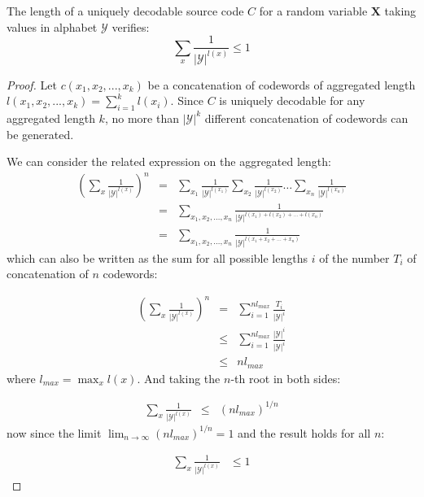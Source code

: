 \begin{theorem} The length of a uniquely decodable source code $C$ for a random variable $\mathbf{X}$ taking values in alphabet $\mathcal{Y}$ verifies:
\begin{equation*}
\sum_{x}\frac{1}{|\mathcal{Y}|^{l(x)}} \leq 1
\end{equation*}
\label{th:mcmillan}
\end{theorem}
\begin{proof}
Let $c(x_1, x_2, ..., x_k)$ be a concatenation of codewords of aggregated length $l(x_1, x_2, ..., x_k)=\sum_{i=1}^k l(x_i)$. Since $C$ is uniquely decodable for any aggregated length $k$, no more than $|\mathcal{Y}|^k$ different concatenation of codewords can be generated. 

We can consider the related expression on the aggregated length:
\begin{eqnarray}
\left( \sum_{x}\frac{1}{|\mathcal{Y}|^{l(x)}} \right)^n &=& \sum_{x_1}\frac{1}{|\mathcal{Y}|^{l(x_1)}} \sum_{x_2}\frac{1}{|\mathcal{Y}|^{l(x_2)}} \dots \sum_{x_n }\frac{1}{|\mathcal{Y}|^{l(x_n)}} \nonumber \\
&=& \sum_{x_1,x_2,\dots,x_n }\frac{1}{|\mathcal{Y}|^{l(x_1)+l(x_2)+\dots +l(x_n)}} \nonumber \\
&=& \sum_{x_1,x_2,\dots,x_n }\frac{1}{|\mathcal{Y}|^{l(x_1+x_2+\dots +x_n)}}
\end{eqnarray}
\noindent which can also be written as the sum for all possible lengths $i$ of the number $T_i$ of concatenation of $n$ codewords:

\begin{eqnarray}
\left( \sum_{x }\frac{1}{|\mathcal{Y}|^{l(x)}} \right)^n &=& \sum_{i=1}^{nl_{max}}\frac{T_i}{|\mathcal{Y}|^i} \nonumber \\
&\leq & \sum_{i=1}^{nl_{max}}\frac{|\mathcal{Y}|^i}{|\mathcal{Y}|^i} \nonumber \\
&\leq & nl_{max}
\end{eqnarray}
\noindent where $l_{max} = \max_{x}l(x)$. And taking the $n$-th root in both sides:

\begin{eqnarray}
\sum_{x }\frac{1}{|\mathcal{Y}|^{l(x)}}  &\leq & (nl_{max})^{1/n}
\end{eqnarray}
\noindent now since the limit $\lim_{n \to \infty } (nl_{max})^{1/n} = 1$ and the result holds for all $n$:

\begin{eqnarray}
\sum_{x }\frac{1}{|\mathcal{Y}|^{l(x)}}  &\leq 1
\end{eqnarray}
\end{proof}

